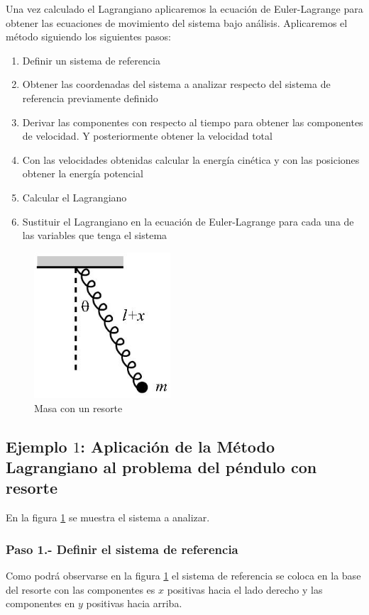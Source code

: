 \documentclass[12pt]{book}
\theoremstyle{definition}
\theoremstyle{remark}
\theoremstyle{plain}
\begin{document}
Una vez calculado el Lagrangiano aplicaremos la ecuación de Euler-Lagrange para obtener las ecuaciones de movimiento del sistema bajo análisis. Aplicaremos  el método siguiendo los siguientes pasos:
\begin{enumerate}
\item Definir un sistema de referencia
\item Obtener las coordenadas del sistema a analizar respecto del sistema de referencia previamente definido
\item Derivar las componentes con respecto al tiempo para obtener las componentes de velocidad. Y posteriormente obtener la velocidad total
\item Con las velocidades obtenidas calcular la energía cinética y con las posiciones obtener la energía potencial
\item Calcular el Lagrangiano
\item Sustituir el Lagrangiano en la ecuación de Euler-Lagrange para cada una de las variables que tenga el sistema
\end{enumerate}

\begin{figure}
\centering
\includegraphics[width=2in]{resorte.jpg}
\caption{Masa con un resorte}
\label{fig100}
\end{figure}

\subsection{Ejemplo $1$: Aplicación de la Método Lagrangiano al problema del péndulo con resorte}
 En la figura \ref{fig100} se muestra el sistema a analizar. 

\subsubsection{Paso 1.- Definir el sistema de referencia}

Como podrá observarse en la figura \ref{fig100} el sistema de referencia se coloca en la base del resorte con las componentes es $x$ positivas hacia el lado derecho y las componentes en $y$ positivas hacia arriba.
\end{document}
